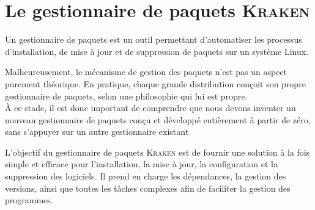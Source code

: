 \clearpage
\section{Le gestionnaire de paquets \textsc{Kraken}}
\label{sec:kraken-pkg}

Un gestionnaire de paquets est un outil  permettant d’automatiser les processus d’installation, de mise à jour et de suppression de paquets sur un système Linux. 

Malheureusement, le mécanisme de gestion des paquets n’est pas un aspect purement théorique. En pratique, chaque grande distribution conçoit son propre gestionnaire de paquets, selon une philosophie qui lui est propre.\\
À ce stade, il est donc important de comprendre que nous devons inventer un nouveau gestionnaire de paquets conçu et développé entièrement à partir de zéro, sans s’appuyer sur
un autre gestionnaire existant

L’objectif du gestionnaire de paquets \textsc{Kraken} est de fournir une solution à la fois simple et efficace pour l’installation, la mise à jour, la configuration et la suppression des logiciels. Il prend en charge les dépendances, la gestion des versions, ainsi que toutes les tâches complexes afin de faciliter la gestion des programmes.








